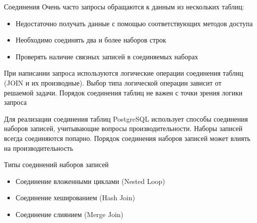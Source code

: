 \documentclass[12pt]{article}
\begin{document}
\begin{nota}{Соединения}
    Очень часто запросы обращаются к данным из нескольких таблиц:

    \begin{itemize}
        \item Недостаточно получать данные с помощью соответствующих методов доступа 
        \item Необходимо соединять два и более наборов строк 
        \item Проверять наличие связных записей в соединяемых наборах 
    \end{itemize}

    При написании запроса используются логические операции соединения таблиц (JOIN и их производные). Выбор типа логической операции зависит от решаемой задачи. Порядок соединения таблиц не важен с точки зрения логики запроса

    Для реализации соединения таблиц PostgreSQL использует способы соединения наборов записей, учитывающие вопросы производительности. Наборы записей всегда соединяются попарно. Порядок соединения наборов записей может влиять на производительность 
\end{nota}

\begin{nota}{Типы соединений наборов записей}
    \begin{itemize}
        \item Соединение вложенными циклами (Nested Loop)
        \item Соединение хешированием (Hash Join)
        \item Соединение слиянием (Merge Join)
    \end{itemize}
\end{nota}
\end{document}
